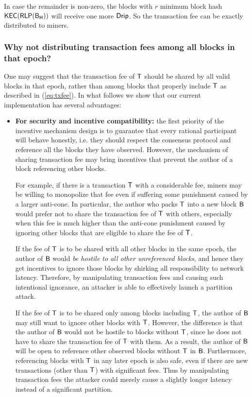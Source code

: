 In case the remainder is non-zero, the blocks with $r$ minimum block hash $\mathsf{KEC}(\mathsf{RLP}(\textsf{B}_{\textsf{H}}))$ will receive one more ${\sf Drip}$. So the transaction fee can be exactly distributed to miners. 


\subsubsection{Why not distributing transaction fees among all blocks in that epoch?}
	One may suggest that the transaction fee of $\textsf{T}$ should be shared by all valid blocks in that epoch, rather than among blocks that properly include $\textsf{T}$ as described in (\ref{eq:txfee}).
	In what follows we show that our current implementation has several advantages:
	\begin{itemize}
		\item {\bf For security and incentive compatibility:} 
		the first priority of the incentive mechanism design is to guarantee that every rational participant will behave honestly, i.e. they should respect the consensus protocol and reference all the blocks they have observed.
		However, the mechanism of sharing transaction fee may bring incentives that prevent the author of a block referencing other blocks.

		For example, if there is a transaction $\textsf{T}$ with a considerable fee, miners may be willing to monopolize that fee even if suffering some punishment caused by a larger anti-cone.
		In particular, the author who packs $\textsf{T}$ into a new block $\textsf{B}$ would prefer not to share the transaction fee of $\textsf{T}$ with others, especially when this fee is much higher than the anti-cone punishment caused by ignoring other blocks that are eligible to share the fee of $\textsf{T}$.

		If the fee of $\textsf{T}$ is to be shared with all other blocks in the same epoch, the author of $\textsf{B}$ would \emph{be hostile to all other unreferenced blocks}, and hence they get incentives to ignore those blocks by shirking all responsibility to network latency. 
		Therefore, by manipulating transaction fees and causing such intentional ignorance, an attacker is able to effectively launch a partition attack.

		If the fee of $\textsf{T}$ is to be shared only among blocks including $\textsf{T}$, the author of $\textsf{B}$ may still want to ignore other blocks with $\textsf{T}$. 
		However, the difference is that the author of $\textsf{B}$ would not be hostile to blocks without $\textsf{T}$, since he does not have to share the transaction fee of $\textsf{T}$ with them.
		As a result, the author of $\textsf{B}$ will be open to reference other observed blocks without $\textsf{T}$ in $\textsf{B}$.
		Furthermore, referencing blocks with $\textsf{T}$ in any later epoch is also safe, even if there are new transactions (other than $\textsf{T}$) with significant fees.
		Thus by manipulating transaction fees the attacker could merely cause a slightly longer latency instead of a significant partition.


\end{itemize}
